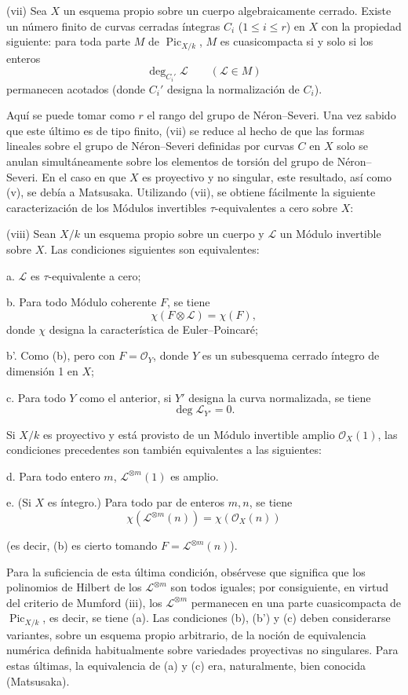 \documentclass[11pt,twoside,openany]{book}
\numberwithin{equation}{section}
\newcommand{\src}[1]{%
  \phantomsection\hypertarget{src:#1}{}%
  \marginpar{\raggedleft\footnotesize\sffamily #1}%
}
\theoremstyle{plain}
\theoremstyle{definition}
\theoremstyle{remark}
\newcommand{\FgaUnitKey}{frontmatter}
\renewcommand{\src}[1]{%
  \phantomsection\hypertarget{src:\FgaUnitKey:#1}{}%
  \marginpar{\raggedleft\footnotesize\sffamily #1}%
}
\theoremstyle{plain}
\theoremstyle{definition}
\theoremstyle{remark}
\begin{document}
\medskip
\noindent(vii) Sea $X$ un esquema propio sobre un cuerpo algebraicamente
cerrado. Existe un número finito de curvas cerradas íntegras $C_i$
($1\leq i\leq r$) en $X$ con la propiedad siguiente: para toda parte $M$ de
$\operatorname{Pic}_{X/k}$, $M$ es cuasicompacta si y solo si los enteros
\[
\deg_{C_i'}\mathcal L\qquad(\mathcal L\in M)
\]
permanecen acotados (donde $C_i'$ designa la normalización de $C_i$).

Aquí se puede tomar como $r$ el rango del grupo de Néron--Severi. Una vez
sabido que este último es de tipo finito, (vii) se reduce al hecho de que las
formas lineales sobre el grupo de Néron--Severi definidas por curvas $C$ en
$X$ solo se anulan simultáneamente sobre los elementos de torsión del grupo de
Néron--Severi. En el caso en que $X$ es proyectivo y no singular, este
resultado, así como (v), se debía a Matsusaka. Utilizando (vii), se obtiene
fácilmente la siguiente caracterización de los Módulos invertibles
$\tau$-equivalentes a cero sobre $X$:

\medskip
\noindent(viii) Sean $X/k$ un esquema propio sobre un cuerpo y $\mathcal L$ un
Módulo invertible sobre $X$. Las condiciones siguientes son equivalentes:

\noindent a. $\mathcal L$ es $\tau$-equivalente a cero;

\noindent b. Para todo Módulo coherente $F$, se tiene
\[
\chi(F\otimes\mathcal L)=\chi(F),
\]
donde $\chi$ designa la característica de Euler--Poincaré;

\noindent b'. Como (b), pero con $F=\mathcal O_Y$, donde $Y$ es un
subesquema cerrado íntegro de dimensión 1 en $X$;

\noindent c. Para todo $Y$ como el anterior, si $Y'$ designa la curva
normalizada, se tiene
\[
\deg\mathcal L_{Y'}=0.
\]

Si $X/k$ es proyectivo y está provisto de un Módulo invertible amplio
$\mathcal O_X(1)$, las condiciones precedentes son también equivalentes a las
siguientes:

\noindent d. Para todo entero $m$, $\mathcal L^{\otimes m}(1)$ es amplio.

\noindent e. (Si $X$ es íntegro.) Para todo par de enteros $m,n$, se tiene
\[
\chi(\mathcal L^{\otimes m}(n))=\chi(\mathcal O_X(n))
\]

\src{306}
(es decir, (b) es cierto tomando $F=\mathcal L^{\otimes m}(n)$).

Para la suficiencia de esta última condición, obsérvese que significa que los
polinomios de Hilbert de los $\mathcal L^{\otimes m}$ son todos iguales; por
consiguiente, en virtud del criterio de Mumford (iii), los
$\mathcal L^{\otimes m}$ permanecen en una parte cuasicompacta de
$\operatorname{Pic}_{X/k}$, es decir, se tiene (a). Las condiciones (b), (b')
y (c) deben considerarse variantes, sobre un esquema propio arbitrario, de la
noción de equivalencia numérica definida habitualmente sobre variedades
proyectivas no singulares. Para estas últimas, la equivalencia de (a) y (c)
era, naturalmente, bien conocida (Matsusaka).
\end{document}
